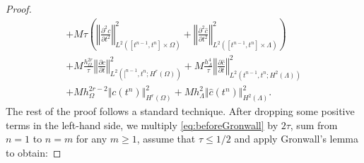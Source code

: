 \documentclass[pdflatex,sn-mathphys-num]{sn-jnl}%
\theoremstyle{thmstyleone}%
\theoremstyle{thmstyletwo}%
\theoremstyle{thmstylethree}%
\begin{document}
\begin{proof}
\begin{align}
     + M \tau \left( \left\Vert \frac{\partial^2 c}{\partial t^2}\right\Vert_{L^2([t^{n-1},t^n]\times \Omega)}^2
     + \left\Vert \frac{\partial^2 \hat c}{\partial t^2}\right\Vert_{L^2([t^{n-1},t^n]\times \Lambda)}^2 \right)
 \nonumber\\
 + M \frac{h_\Omega^{2r}}{\tau} \left\Vert \frac{\partial c}{\partial t}\right\Vert_{L^2([^{n-1},t^n;H^r(\Omega))}^2
 + M \frac{h_\Lambda^{4}}{\tau} \left\Vert \frac{\partial \hat c}{\partial t}\right\Vert_{L^2(t^{n-1},t^n;H^2(\Lambda))}^2
 \nonumber\\
 + M h_\Omega^{2r-2} \Vert c(t^n)\Vert_{H^r(\Omega)}^2
 + M h_\Lambda^2 \Vert \hat c(t^n)\Vert_{H^2(\Lambda)}^2.
 \label{eq:beforeGronwall}
     \end{align}
The rest of the proof follows a standard technique. After dropping some positive terms in the left-hand side, we multiply \eqref{eq:beforeGronwall} by $2\tau$,
sum from $n=1$ to $n=m$ for any $m\geq 1$, assume that $\tau \leq 1/2$ and apply Gronwall's lemma to obtain:

\end{proof}
\end{document}
